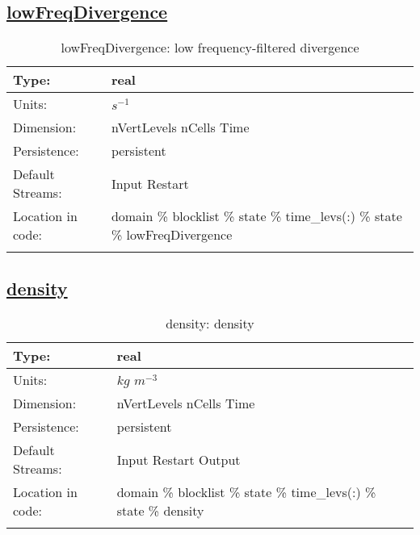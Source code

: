 \subsection[lowFreqDivergence]{\hyperref[sec:var_tab_state]{lowFreqDivergence}}
\label{subsec:var_sec_state_lowFreqDivergence}
\begin{center}
\begin{longtable}{| p{2.0in} | p{4.0in} |}
        \hline 
        Type: & real \\
        \hline 
        Units: & $s^{-1}$ \\
        \hline 
        Dimension: & nVertLevels nCells Time \\
        \hline 
        Persistence: & persistent \\
        \hline 
		 Default Streams: & Input Restart  \\
        \hline 
		 Location in code: & domain \% blocklist \% state \% time\_levs(:) \% state \% lowFreqDivergence \\
		 \hline 
    \caption{lowFreqDivergence: low frequency-filtered divergence}
\end{longtable}
\end{center}
\subsection[density]{\hyperref[sec:var_tab_state]{density}}
\label{subsec:var_sec_state_density}
\begin{center}
\begin{longtable}{| p{2.0in} | p{4.0in} |}
        \hline 
        Type: & real \\
        \hline 
        Units: & $kg$ $m^{-3}$ \\
        \hline 
        Dimension: & nVertLevels nCells Time \\
        \hline 
        Persistence: & persistent \\
        \hline 
		 Default Streams: & Input Restart Output  \\
        \hline 
		 Location in code: & domain \% blocklist \% state \% time\_levs(:) \% state \% density \\
		 \hline 
    \caption{density: density}
\end{longtable}
\end{center}
